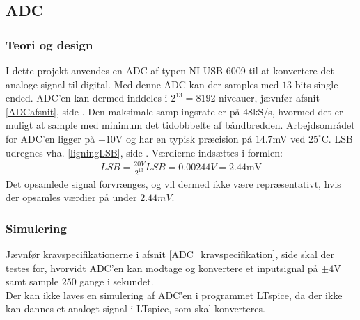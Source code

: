 \subsection{ADC}\label{ADC_afsnit}
\subsubsection{Teori og design}
I dette projekt anvendes en ADC af typen NI USB-6009 til at konvertere det analoge signal til digital. %
Med denne ADC kan der samples med $13$ bits single-ended. ADC'en kan dermed inddeles i $2^{13} = 8192$ niveauer, jævnfør afsnit \ref{ADCafsnit}, side \pageref{ADCafsnit}. Den maksimale samplingsrate er på $48$kS/s, hvormed det er muligt at sample med minimum det tidobbbelte af båndbredden. Arbejdsområdet for ADC'en ligger på $\pm10$V og har en typisk præcision på $14.7$mV ved $25^{\circ}$C. \cite{Instruments2014} LSB udregnes vha. \eqref{ligningLSB}, side \pageref{ligningLSB}. %
Værdierne indsættes i formlen: \\
\begin{align}
	LSB = \frac{20V}{2^{13}}
	LSB = 0.00244V = 2.44\text{mV}
\end{align}
Det opsamlede signal forvrænges, og vil dermed ikke være repræsentativt, hvis der opsamles værdier på under $2.44mV$.\\
\subsubsection{Simulering}
Jævnfør kravspecifikationerne i afsnit \ref{ADC_kravspecifikation}, side \pageref{ADC_kravspecifikation} skal der testes for, hvorvidt ADC'en kan modtage og konvertere et inputsignal på $\pm4$V samt sample $250$ gange i sekundet. \\
Der kan ikke laves en simulering af ADC'en i programmet LTspice, da der ikke kan dannes et analogt signal i LTspice, som skal konverteres.
 
